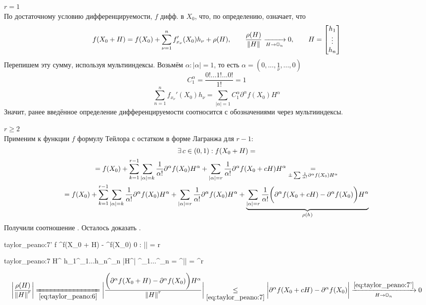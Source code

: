 \begin{iproof}
	\item $ r = 1 $ \\
	По достаточному условию дифференцируемости, $ f $ дифф. в $ X_0 $, что, по определению, означает, что
	$$ f(X_0 + H) = f(X_0) + \sum_{\nu = 1}^n f_{x_\nu}'(X_0) h_\nu + \rho(H), \qquad \frac{\rho(H)}{\left\|{H}\right\|} \xrightarrow[H \to \mathbb{O}_{n}]{} 0, \qquad H =  \begin{bmatrix} {h_1} \\ \vdots \\ {h_n} \end{bmatrix}  $$
	Перепишем эту сумму, используя мультииндексы. Возьмём $ \alpha : |\alpha| = 1 $, то есть $ \alpha = (0, ..., \underset\nu1, ..., 0) $
	$$ C_1^\alpha = \frac{0!...1!...0!}{1!} = 1 $$
	$$ \sum_{n = 1}^n f_{x_\nu}'(X_0)h_\nu = \sum_{|\alpha| = 1}C_1^\alpha \partial^\alpha f(X_0) H^\alpha $$
	Значит, ранее введённое определение дифференцируемости соотносится с обозначениями через мультииндексы.
	\item $ r \ge 2 $ \\
	Применим к функции $ f $ формулу Тейлора с остатком в форме Лагранжа для $ r - 1 $:
	\begin{multline}\lbl{taylor_peano:6}
		\exist c \in (0, 1) : f(X_0 + H) = \\
		= f(X_0) + \sum_{k = 1}^{r - 1} \sum_{|\alpha| = k} \frac1{\alpha!} \partial^\alpha f(X_0)H^\alpha + \sum_{|\alpha| = r} \frac1{\alpha!} \partial^\alpha f(X_0 + cH)H^\alpha \underset{\pm \sum \frac1{\alpha!} \partial^\alpha f(X_0)H^\alpha}= \\
		= f(X_0) + \sum_{k = 1}^{r - 1} \sum_{|\alpha| = k} \frac1{\alpha!} \partial^\alpha f(X_0) H^\alpha + \sum_{|\alpha| = r} \frac1{\alpha!} \partial^\alpha f(X_0) H^\alpha + \underbrace{\sum_{|\alpha| = r} \frac1{\alpha!} \bigg( \partial^\alpha f(X_0 + cH) - \partial^\alpha f(X_0) \bigg)H^\alpha}_{\rho(h)}
	\end{multline}
	Получили соотношение . Осталось доказать .
	\begin{equ}{taylor_peano:7'}
		f \in \Cont[r]\omega {} \partial^\alpha f(X_0 + H) - \partial^\alpha f(X_0)  0 \qquad \forall \alpha : |\alpha| = r
	\end{equ}
	\begin{equ}{taylor_peano:7}
		H^\alpha {} h_1^{\alpha_1}...h_n^{\alpha_n} \implies |H^\alpha| \le {}^{\alpha_1}...^{\alpha_n} = ^{|\alpha|} = ^r \implies {} 
	\end{equ}
	$$ \bigg| \frac{\rho(H)}{\norm{H}^r} \bigg| \undereq{\eref{taylor_peano:6}} \bigg| \frac{\bigg( \partial^\alpha f(X_0 + H) - \partial^\alpha f(X_0) \bigg)H^\alpha}{\norm{H}^r} \bigg| \underset{\eref{taylor_peano:7}}\le \bigg| \partial^\alpha f(X_0 + cH) - \partial^\alpha f(X_0) \bigg| \xrightarrow[H \to \On]{\eref{taylor_peano:7'}} 0 $$
\end{iproof}

